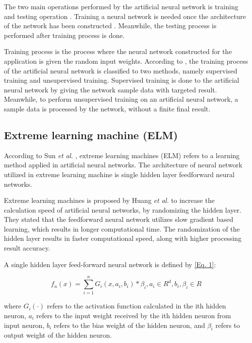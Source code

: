 \documentclass[journal,comsoc]{IEEEtran}
\begin{document}
The two main operations performed by the artificial neural network is training and testing operation \cite{Uhrig95}. Training a neural network is needed once the architecture of the network has been constructed \cite{Reingnold16}. Meanwhile, the testing process is performed after training process is done.

Training process is the process where the neural network constructed for the application is given the random input weights. According to \cite{Heeswijk15}, the training process of the artificial neural network is classified to two methods, namely supervised training and unsupervised training. Supervised training is done to the artificial neural network by giving the network sample data with targeted result. Meanwhile, to perform unsupervised training on an artificial neural network, a sample data is processed by the network, without a finite final result.

\subsection{Extreme learning machine (ELM)}

According to Sun \textit{et al.} \cite{Gao14}, extreme learning machines (ELM) refers to a learning method applied in artificial neural networks. The architecture of neural network utilized in extreme learning machine is single hidden layer feedforward neural networks.

Extreme learning machines is proposed by Huang \textit{et al.} \cite{Huang06} to increase the calculation speed of artificial neural networks, by randomizing the hidden layer. They stated that the feedforward neural network utilizes slow gradient based learning, which results in longer computational time. The randomization of the hidden layer results in faster computational speed, along with higher processing result accuracy.

A single hidden layer feed-forward neural network is defined by \eqref{Eq. 1}:

\begin{equation}
f_{n} (x) = \sum_{i=1}^{n} G_{i} (x, a_{i}, b_{i}) * \beta_{i}, a_{i} \in R^d, b_{i}, \beta_{i} \in R\label{Eq. 1}
\end{equation}

where $G_{i}(\cdot)$ refers to the activation function calculated in the ith hidden neuron, $a_{i}$ refers to the input weight received by the ith hidden neuron from input neuron, $b_{i}$ refers to the bias weight of the hidden neuron, and $\beta_{i}$ refers to output weight of the hidden neuron.
\end{document}
